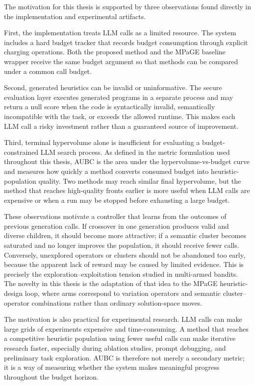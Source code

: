 The motivation for this thesis is supported by three observations found directly in the implementation and experimental artifacts.

First, the implementation treats LLM calls as a limited resource. The system includes a hard budget tracker that records budget consumption through explicit charging operations. Both the proposed method and the MPaGE baseline wrapper receive the same budget argument so that methods can be compared under a common call budget.

Second, generated heuristics can be invalid or uninformative. The secure evaluation layer executes generated programs in a separate process and may return a null score when the code is syntactically invalid, semantically incompatible with the task, or exceeds the allowed runtime. This makes each LLM call a risky investment rather than a guaranteed source of improvement.

Third, terminal hypervolume alone is insufficient for evaluating a budget-constrained LLM search process. As defined in the metric formulation used throughout this thesis, AUBC is the area under the hypervolume-vs-budget curve and measures how quickly a method converts consumed budget into heuristic-population quality. Two methods may reach similar final hypervolume, but the method that reaches high-quality fronts earlier is more useful when LLM calls are expensive or when a run may be stopped before exhausting a large budget.

These observations motivate a controller that learns from the outcomes of previous generation calls. If crossover in one generation produces valid and diverse children, it should become more attractive; if a semantic cluster becomes saturated and no longer improves the population, it should receive fewer calls. Conversely, unexplored operators or clusters should not be abandoned too early, because the apparent lack of reward may be caused by limited evidence. This is precisely the exploration--exploitation tension studied in multi-armed bandits. The novelty in this thesis is the adaptation of that idea to the MPaGE heuristic-design loop, where arms correspond to variation operators and semantic cluster--operator combinations rather than ordinary solution-space moves.

The motivation is also practical for experimental research. LLM calls can make large grids of experiments expensive and time-consuming. A method that reaches a competitive heuristic population using fewer useful calls can make iterative research faster, especially during ablation studies, prompt debugging, and preliminary task exploration. AUBC is therefore not merely a secondary metric; it is a way of measuring whether the system makes meaningful progress throughout the budget horizon.

